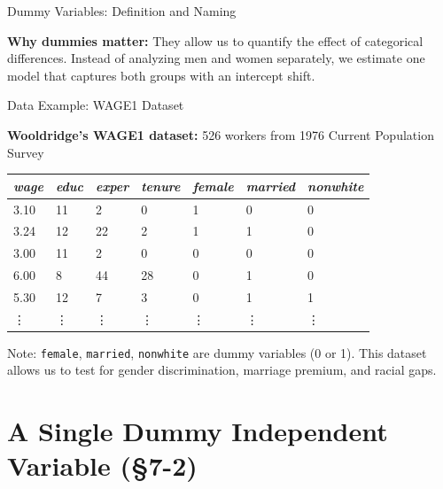 \documentclass[aspectratio=169, 12pt]{beamer}
\begin{document}
\begin{frame}[shrink=20]{Dummy Variables: Definition and Naming}
  \medskip

  \begin{keybox}
    \textbf{Why dummies matter:} They allow us to quantify the effect of categorical differences. Instead of analyzing men and women separately, we estimate one model that captures both groups with an intercept shift.
  \end{keybox}

\end{frame}

\begin{frame}[shrink=25]{Data Example: WAGE1 Dataset}

  \textbf{Wooldridge's WAGE1 dataset:} 526 workers from 1976 Current Population Survey

  \medskip

  \begin{center}
    \small
    \begin{tabular}{lllllll}
      \toprule
      \textit{wage} & \textit{educ} & \textit{exper} & \textit{tenure} & \textit{female} & \textit{married} & \textit{nonwhite} \\
      \midrule
      3.10 & 11 & 2 & 0 & 1 & 0 & 0 \\
      3.24 & 12 & 22 & 2 & 1 & 1 & 0 \\
      3.00 & 11 & 2 & 0 & 0 & 0 & 0 \\
      6.00 & 8 & 44 & 28 & 0 & 1 & 0 \\
      5.30 & 12 & 7 & 3 & 0 & 1 & 1 \\
      \vdots & \vdots & \vdots & \vdots & \vdots & \vdots & \vdots \\
      \bottomrule
    \end{tabular}
  \end{center}

  \medskip

  \begin{keybox}
    Note: \texttt{female}, \texttt{married}, \texttt{nonwhite} are dummy variables (0 or 1).
    This dataset allows us to test for gender discrimination, marriage premium, and racial gaps.
  \end{keybox}

\end{frame}

\section{A Single Dummy Independent Variable (\S7-2)}
\end{document}
